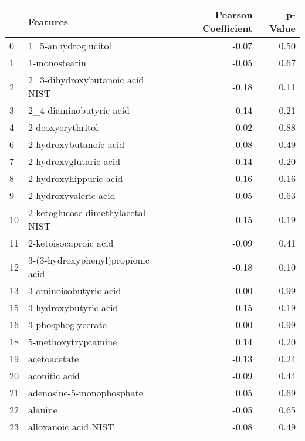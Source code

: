 \begin{tabular}{llrr}
\toprule
{} &                           Features &  Pearson Coefficient &  p-Value \\
\midrule
0   &                1\_5-anhydroglucitol &                -0.07 &     0.50 \\
1   &                      1-monostearin &                -0.05 &     0.67 \\
2   &    2\_3-dihydroxybutanoic acid NIST &                -0.18 &     0.11 \\
3   &            2\_4-diaminobutyric acid &                -0.14 &     0.21 \\
4   &                  2-deoxyerythritol &                 0.02 &     0.88 \\
6   &             2-hydroxybutanoic acid &                -0.08 &     0.49 \\
7   &             2-hydroxyglutaric acid &                -0.14 &     0.20 \\
8   &             2-hydroxyhippuric acid &                 0.16 &     0.16 \\
9   &              2-hydroxyvaleric acid &                 0.05 &     0.63 \\
10  &  2-ketoglucose dimethylacetal NIST &                 0.15 &     0.19 \\
11  &              2-ketoisocaproic acid &                -0.09 &     0.41 \\
12  &  3-(3-hydroxyphenyl)propionic acid &                -0.18 &     0.10 \\
13  &             3-aminoisobutyric acid &                 0.00 &     0.99 \\
15  &              3-hydroxybutyric acid &                 0.15 &     0.19 \\
16  &                 3-phosphoglycerate &                 0.00 &     0.99 \\
18  &                5-methoxytryptamine &                 0.14 &     0.20 \\
19  &                       acetoacetate &                -0.13 &     0.24 \\
20  &                      aconitic acid &                -0.09 &     0.44 \\
21  &          adenosine-5-monophosphate &                 0.05 &     0.69 \\
22  &                            alanine &                -0.05 &     0.65 \\
23  &               alloxanoic acid NIST &                -0.08 &     0.49 \\

\end{tabular}
